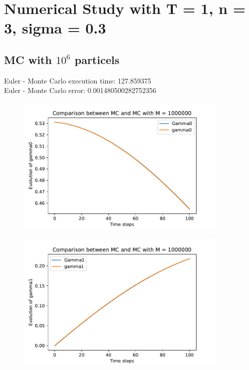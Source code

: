 \documentclass[a4paper,11pt,openright]{report}
\begin{document}
\chapter*{Numerical Study with T = 1, n = 3, sigma = 0.3}

\section{MC with $10^6$ particels}
Euler - Monte Carlo execution time:  127.859375 \\
Euler - Monte Carlo error:  0.001480500282752356

\begin{figure}[H]
\centering
\includegraphics[width=0.9\textwidth]{gamma0 MC = 1000000.pdf}
\end{figure}
\begin{figure}[H]
\centering
\includegraphics[width=0.9\textwidth]{gamma1 MC = 1000000.pdf}
\end{figure}
\end{document}

